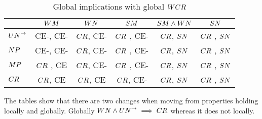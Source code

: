 \begin{table}[h!]
    \centering
    \caption{Global implications with global $\WCR$}
    \begin{tabular}{|l|c|c|c|c|c|}
    \hline
            & $\WM$         & $\WN$         & $\SM$             & $\SMandWN$        & $\SN$ \\
    \hline
    $\UNto$ &  CE-, CE-     & $\CR$, CE-    &  $\CR$ , CE-      & $\CR$, $\SN$      &  $\CR$ , $\SN$ \\
    \hline
    $\NP$ & CE-, CE-      & $\CR$, CE-    &  $\CR$ , CE-      & $\CR$, $\SN$      &  $\CR$ , $\SN$ \\
    \hline
    $\MP$ & $\CR$ , CE    & $\CR$, CE-    &  $\CR$ , CE-      & $\CR$, $\SN$      &  $\CR$ , $\SN$ \\
    \hline
    $\CR$   & $\CR$, CE     & $\CR$, CE     &  $\CR$, CE-       & $\CR$, $\SN$      & $\CR$ , $\SN$ \\
    \hline
    
    \end{tabular}
\end{table}


The tables show that there are two changes when moving from properties holding locally and globally. 
Globally $\WN \land \UNto \implies \CR$ whereas it does not locally. 